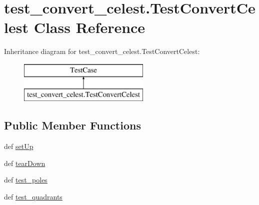 \hypertarget{classtest__convert__celest_1_1_test_convert_celest}{\section{test\-\_\-convert\-\_\-celest.\-Test\-Convert\-Celest Class Reference}
\label{classtest__convert__celest_1_1_test_convert_celest}
}
Inheritance diagram for test\-\_\-convert\-\_\-celest.\-Test\-Convert\-Celest\-:\begin{figure}[H]
\begin{center}
\leavevmode
\includegraphics[height=2.000000cm]{classtest__convert__celest_1_1_test_convert_celest}
\end{center}
\end{figure}
\subsection*{Public Member Functions}
\begin{DoxyCompactItemize}
\item 
def \hyperlink{classtest__convert__celest_1_1_test_convert_celest_a8fd1939ab7d996c7923408df42a13b0f}{set\-Up}
\item 
def \hyperlink{classtest__convert__celest_1_1_test_convert_celest_aaf41fa49cf37ddbad86b6e6af4827db1}{tear\-Down}
\item 
def \hyperlink{classtest__convert__celest_1_1_test_convert_celest_a086e6c724cb8acc6d7bfbca28db421b7}{test\-\_\-poles}
\item 
def \hyperlink{classtest__convert__celest_1_1_test_convert_celest_a5fb62371cbd71130b2f2b55792e7595e}{test\-\_\-quadrants}
\end{DoxyCompactItemize}


